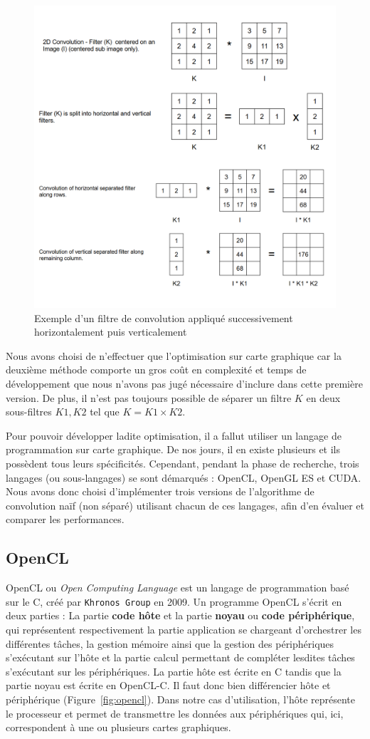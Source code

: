 \begin{figure}[H]
\centering
\includegraphics[width=0.7\linewidth]{images/separableconv}
\caption{Exemple d'un filtre de convolution appliqué successivement horizontalement puis verticalement}
\label{fig:conv:separable}
\end{figure}

Nous avons choisi de n'effectuer que l'optimisation sur carte graphique car la deuxième méthode comporte un gros coût en complexité et temps de développement que nous n'avons pas jugé nécessaire d'inclure dans cette première version. De plus, il n'est pas toujours possible de séparer un filtre $K$ en deux sous-filtres $K1, K2$ tel que $K = K1 \times K2$.

Pour pouvoir développer ladite optimisation, il a fallut utiliser un langage de programmation sur carte graphique. De nos jours, il en existe plusieurs et ils possèdent tous leurs spécificités. Cependant, pendant la phase de recherche, trois langages (ou sous-langages) se sont démarqués : OpenCL\cite{opencl}, OpenGL ES\cite{opengles} et CUDA\cite{cuda}. Nous avons donc choisi d'implémenter trois versions de l'algorithme de convolution naïf (non séparé) utilisant chacun de ces langages, afin d'en évaluer et comparer les performances.

\subsection{OpenCL} 
OpenCL ou \emph{Open Computing Language} est un langage de programmation basé sur le C, créé par \texttt{Khronos Group} en 2009.
Un programme OpenCL s'écrit en deux parties : La partie \textbf{code hôte} et la partie \textbf{noyau} ou \textbf{code périphérique}, qui représentent respectivement la partie application se chargeant d'orchestrer les différentes tâches, la gestion mémoire ainsi que la gestion des périphériques s'exécutant sur l'hôte et la partie calcul permettant de compléter lesdites tâches s'exécutant sur les périphériques. La partie hôte est écrite en C tandis que la partie noyau est écrite en OpenCL-C.
Il faut donc bien différencier hôte et périphérique (Figure~\ref{fig:opencl}). Dans notre cas d'utilisation, l'hôte représente le processeur et permet de transmettre les données aux périphériques qui, ici, correspondent à une ou plusieurs cartes graphiques.

